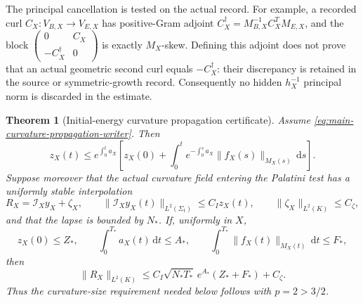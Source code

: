 \documentclass[11pt]{article}
\newtheorem{theorem}{Theorem}[section]
\theoremstyle{definition}
\theoremstyle{remark}
\newcommand{\dd}{\mathrm d}
\begin{document}
The principal cancellation is tested on the actual record.  For example, a
recorded curl $C_X:V_{B,X}\to V_{E,X}$ has positive-Gram adjoint
$C_X^\dagger=M_{B,X}^{-1}C_X^TM_{E,X}$, and the block
$\left(\begin{smallmatrix}0&C_X\\-C_X^\dagger&0\end{smallmatrix}\right)$
is exactly $M_X$-skew.  Defining this adjoint does not prove that an actual
geometric second curl equals $-C_X^\dagger$: their discrepancy is retained
in the source or symmetric-growth record.  Consequently no hidden
$h_X^{-1}$ principal norm is discarded in the estimate.

\begin{theorem}[Initial-energy curvature propagation certificate]
\label{thm:main-curvature-propagation}
Assume \eqref{eq:main-curvature-propagation-writer}.  Then
\begin{equation}
 \boxed{
 z_X(t)\le e^{\int_0^t a_X}
 \left[z_X(0)+\int_0^t e^{-\int_0^s a_X}
 \|f_X(s)\|_{M_X(s)}\,\dd s\right].}
 \label{eq:main-curvature-energy-propagation}
\end{equation}
Suppose moreover that the actual curvature field entering the Palatini test has
a uniformly stable interpolation
\begin{equation}
 R_X=\mathcal I_Xy_X+\zeta_X,
 \qquad
 \|\mathcal I_Xy_X(t)\|_{L^2(\Sigma_t)}\le C_Iz_X(t),
 \qquad
 \|\zeta_X\|_{L^2(K)}\le C_\zeta,
 \label{eq:main-curvature-incidence}
\end{equation}
and that the lapse is bounded by $N_*$.  If, uniformly in $X$,
\begin{equation}
 z_X(0)\le Z_*,\qquad
 \int_0^{T_*}a_X(t)\,\dd t\le A_*,\qquad
 \int_0^{T_*}\|f_X(t)\|_{M_X(t)}\,\dd t\le F_*,
 \label{eq:main-curvature-budgets}
\end{equation}
then
\begin{equation}
 \boxed{
 \|R_X\|_{L^2(K)}
 \le C_I\sqrt{N_*T_*}\,e^{A_*}(Z_*+F_*)+C_\zeta.}
 \label{eq:main-derived-l2-curvature}
\end{equation}
Thus the curvature-size requirement needed below follows with $p=2>3/2$.
\end{theorem}
\end{document}
